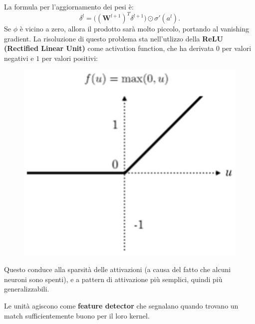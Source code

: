 La formula per l'aggiornamento dei pesi è:
\begin{equation}
    \delta^l = \big( (\textbf{W}^{l+1})^T \delta^{l+1} \big) \odot \sigma' (a^l).
\end{equation}
Se $\phi$ è vicino a zero, allora il prodotto sarà molto piccolo, portando al vanishing gradient.
\newline
\newline
La risoluzione di questo problema sta nell'utlizzo della \textbf{ReLU (Rectified Linear Unit)} come activation function, che ha derivata $0$ per valori negativi e $1$ per valori positivi:
\begin{figure}[!h]
    \includegraphics[scale=.4]{images/cnn/relu.png}
    \centering
\end{figure}


Questo conduce alla sparsità delle attivazioni (a causa del fatto che alcuni neuroni sono spenti), e a pattern di attivazione più semplici, quindi più generalizzabili.


Le unità agiscono come \textbf{feature detector} che segnalano quando trovano un match sufficientemente buono per il loro kernel.
\newpage
